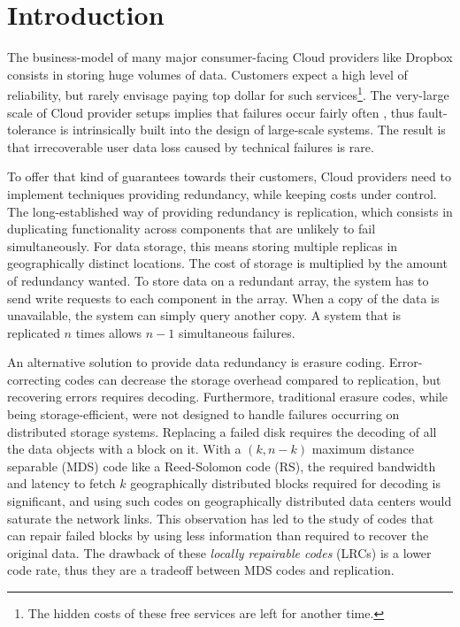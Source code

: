 \section{Introduction}
\label{sec:intro}

The business-model of many major consumer-facing Cloud providers like Dropbox consists in storing huge volumes of data. Customers expect a high level of reliability, but rarely envisage paying top dollar for such services\footnote{The hidden costs of these free services are left for another time.}. 
The very-large scale of Cloud provider setups implies that failures occur fairly often \autocite{failures-study}, thus fault-tolerance is intrinsically built into the design of large-scale systems. 
The result is that irrecoverable user data loss caused by technical failures is rare\autocite{racs}.

To offer that kind of guarantees towards their customers, Cloud providers need to implement techniques providing redundancy, while keeping costs under control. 
The long-established way of providing redundancy is replication, which consists in duplicating functionality across components that are unlikely to fail simultaneously. 
For data storage, this means storing multiple replicas in geographically distinct locations. 
The cost of storage is multiplied by the amount of redundancy wanted. 
To store data on a redundant array, the system has to send write requests to each component in the array. 
When a copy of the data is unavailable, the system can simply query another copy. 
A system that is replicated $n$ times allows $n-1$ simultaneous failures.

An alternative solution to provide data redundancy is erasure coding. 
Error-correcting codes can decrease the storage overhead compared to replication, but recovering errors requires decoding. 
Furthermore, traditional erasure codes, while being storage-efficient, were not designed to handle failures occurring on distributed storage systems. 
Replacing a failed disk requires the decoding of all the data objects with a block on it. With a $(k,n-k)$ maximum distance separable (MDS) code like a Reed-Solomon code (RS), the required bandwidth and latency to fetch $k$ geographically distributed blocks required for decoding is significant, and using such codes on geographically distributed data centers would saturate the network links. 
This observation has led to the study of codes that can repair failed blocks by using less information than required to recover the original data. 
The drawback of these \emph{locally repairable codes} (LRCs) is a lower code rate, thus they are a tradeoff between MDS codes and replication.

